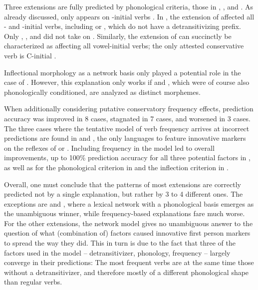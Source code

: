Three extensions are fully predicted by phonological criteria, those in \akuriyo, \carijo, and \yukpa.
As already discussed, \akuriyo {} only appears on -initial verbs .
In \carijo, the extension of  affected all - and -initial verbs, including   or  , which do not have a detransitivizing prefix.
Only  ,  , and   did not take on .
Similarly, the extension of \yukpa {} can succinctly be characterized as affecting all vowel-initial verbs; the only attested conservative verb is C-initial  .

Inflectional morphology as a network basis only played a potential role in the case of \akuriyo.
However, this explanation only works if  and , which were of course also phonologically conditioned, are analyzed as distinct morphemes.

When additionally considering putative conservatory frequency effects, prediction accuracy was improved in 8 cases, stagnated in 7 cases, and worsened in 3 cases.
The three cases where the tentative model of verb frequency arrives at incorrect predictions are found in \carijo and \yukpa, the only languages to feature innovative markers on the reflexes of   or  .
Including frequency in the model led to overall improvements, up to 100\% prediction accuracy for all three potential factors in \PTir, as well as for the phonological criterion in \PPek and the inflection criterion in \PWai.

Overall, one must conclude that the patterns of most extensions are correctly predicted not by a single explanation, but rather by 3 to 4 different ones.
The exceptions are \carijo and \yukpa, where a lexical network with a phonological basis emerges as the unambiguous winner, while frequency-based explanations fare much worse.
For the other extensions, the network model gives no unambiguous answer to the question of what (combination of) factors caused innovative first person markers to spread the way they did.
This in turn is due to the fact that three of the factors used in the model -- detransitivizer, phonology, frequency -- largely converge in their predictions:
The most frequent  verbs are at the same time those without a detransitivizer, and therefore mostly of a different phonological shape than regular  verbs.